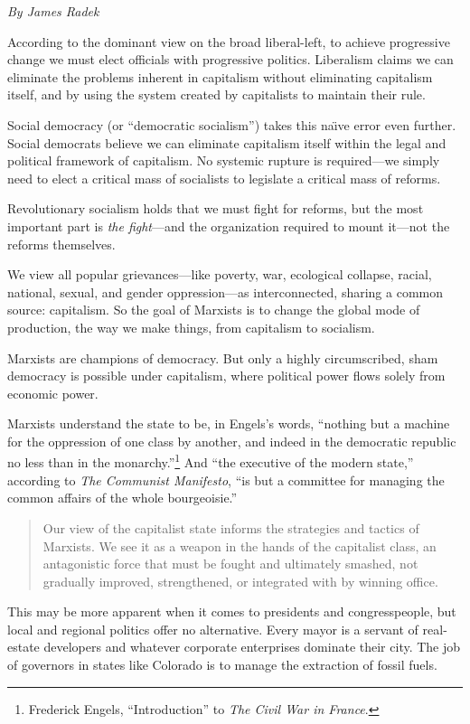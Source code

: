 \emph{By James Radek}

According to the dominant view on the broad liberal-left, to achieve progressive change we must elect officials with progressive politics. Liberalism claims we can eliminate the problems inherent in capitalism without eliminating capitalism itself, and by using the system created by capitalists to maintain their rule.

Social democracy (or ``democratic socialism'') takes this na\"{\i}ve error even further. Social democrats believe we can eliminate capitalism itself within the legal and political framework of capitalism. No systemic rupture is required---we simply need to elect a critical mass of socialists to legislate a critical mass of reforms.

Revolutionary socialism holds that we must fight for reforms, but the most important part is \emph{the fight}---and the organization required to mount it---not the reforms themselves.

We view all popular grievances---like poverty, war, ecological collapse, racial, national, sexual, and gender oppression---as interconnected, sharing a common source: capitalism. So the goal of Marxists is to change the global mode of production, the way we make things, from capitalism to socialism.

Marxists are champions of democracy. But only a highly circumscribed, sham democracy is possible under capitalism, where political power flows solely from economic power.

Marxists understand the state to be, in Engels's words, ``nothing but a machine for the oppression of one class by another, and indeed in the democratic republic no less than in the monarchy.''\footnote{Frederick Engels, ``Introduction'' to \emph{The Civil War in France}.} And ``the executive of the modern state,'' according to \emph{The Communist Manifesto}, ``is but a committee for managing the common affairs of the whole bourgeoisie.''

\blockquote{Our view of the capitalist state informs the strategies and tactics of Marxists. We see it as a weapon in the hands of the capitalist class, an antagonistic force that must be fought and ultimately smashed, not gradually improved, strengthened, or integrated with by winning office.}

This may be more apparent when it comes to presidents and congresspeople, but local and regional politics offer no alternative. Every mayor is a servant of real-estate developers and whatever corporate enterprises dominate their city. The job of governors in states like Colorado is to manage the extraction of fossil fuels.


